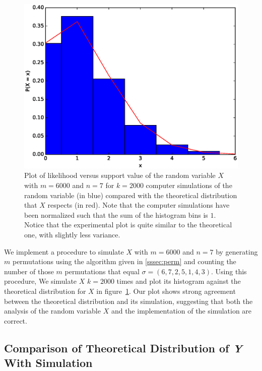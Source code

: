 \documentclass[11pt, oneside]{article}   	%
\begin{document}
\begin{figure}[H]
\includegraphics[scale=.5]{part_1_problem_4}
\caption{Plot of likelihood versus support value of the random variable $X$ with $m = 6000$ and $n = 7$ for $k = 2000$ computer simulations of the random variable (in blue) compared with the theoretical distribution that $X$ respects (in red). Note that the computer simulations have been normalized such that the sum of the histogram bins is $1$. Notice that the experimental plot is quite similar to the theoretical one, with slightly less variance.}
\label{fig:x}
\end{figure}

We implement a procedure to simulate $X$ with $m = 6000$ and $n = 7$ by generating $m$ permutations using the algorithm given in \ref{sssec:perm} and counting the number of those $m$ permutations that equal $\sigma = (6, 7, 2, 5, 1, 4, 3)$. Using this procedure, We simulate $X$ $k = 2000$ times and plot its histogram against the theoretical distribution for $X$ in figure~\ref{fig:x}. Our plot shows strong agreement between the theoretical distribution and its simulation, suggesting that both the analysis of the random variable $X$ and the implementation of the simulation are correct.

\subsection{Comparison of Theoretical Distribution of \textit{Y} With Simulation}
\end{document}
